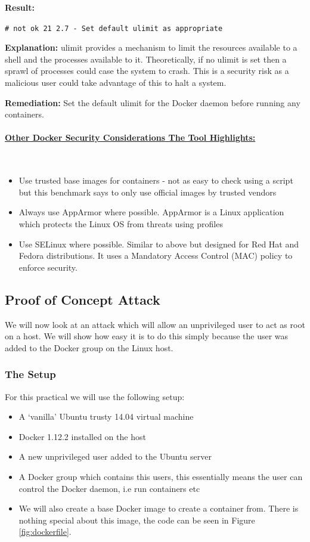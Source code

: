 \documentclass{article}
\begin{document}
\textbf{Result:} 

\texttt{\# not ok 21 2.7 - Set default ulimit as appropriate}

\textbf{Explanation:} ulimit provides a mechanism to limit the resources available to a shell and the processes available to it. Theoretically, if no ulimit is set then a sprawl of processes could case the system to crash. This is a security risk as a malicious user could take advantage of this to halt a system.

\textbf{Remediation:} Set the default ulimit for the Docker daemon before running any containers.

\paragraph{\underline{Other Docker Security Considerations The Tool Highlights:}}\mbox{}\\

\begin{itemize}
  \item Use trusted base images for containers - not as easy to check using a script but this benchmark says to only use official images by trusted vendors
  \item Always use AppArmor where possible. AppArmor is a Linux application which protects the Linux OS from threats using profiles
  \item Use SELinux where possible. Similar to above but designed for Red Hat and Fedora distributions. It uses a Mandatory Access Control (MAC) policy to enforce security.
\end{itemize}

\subsection{Proof of Concept Attack}
\label{sub:attack}
We will now look at an attack which will allow an unprivileged user to act as root on a host. We will show how easy it is to do this simply because the user was added to the Docker group on the Linux host. 

\subsubsection{The Setup}
For this practical we will use the following setup:

\begin{itemize}
  \item A `vanilla' Ubuntu trusty 14.04 virtual machine
  \item Docker 1.12.2 installed on the host
  \item A new unprivileged user added to the Ubuntu server
  \item A Docker group which contains this users, this essentially means the user can control the Docker daemon, i.e run containers etc
  \item We will also create a base Docker image to create a container from. There is nothing special about this image, the code can be seen in Figure \ref{fig:dockerfile}.
\end{itemize}
\end{document}
